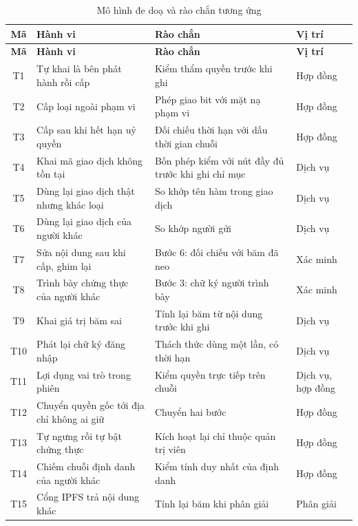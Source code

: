 \begin{longtable}{|c|p{4.6cm}|p{6.0cm}|p{2.0cm}|}
\caption{Mô hình đe doạ và rào chắn tương ứng}
\label{tab:v2-threat} \\
\hline
\textbf{Mã} & \textbf{Hành vi} & \textbf{Rào chắn} & \textbf{Vị trí} \\ \hline
\endfirsthead
\hline
\textbf{Mã} & \textbf{Hành vi} & \textbf{Rào chắn} & \textbf{Vị trí} \\ \hline
\endhead
T1 & Tự khai là bên phát hành rồi cấp & Kiểm thẩm quyền trước khi ghi & Hợp đồng \\ \hline
T2 & Cấp loại ngoài phạm vi & Phép giao bit với mặt nạ phạm vi & Hợp đồng \\ \hline
T3 & Cấp sau khi hết hạn uỷ quyền & Đối chiếu thời hạn với dấu thời gian chuỗi & Hợp đồng \\ \hline
T4 & Khai mã giao dịch không tồn tại & Bốn phép kiểm với nút đầy đủ trước khi ghi chỉ mục & Dịch vụ \\ \hline
T5 & Dùng lại giao dịch thật nhưng khác loại & So khớp tên hàm trong giao dịch & Dịch vụ \\ \hline
T6 & Dùng lại giao dịch của người khác & So khớp người gửi & Dịch vụ \\ \hline
T7 & Sửa nội dung sau khi cấp, ghim lại & Bước 6: đối chiếu với băm đã neo & Xác minh \\ \hline
T8 & Trình bày chứng thực của người khác & Bước 3: chữ ký người trình bày & Xác minh \\ \hline
T9 & Khai giá trị băm sai & Tính lại băm từ nội dung trước khi ghi & Dịch vụ \\ \hline
T10 & Phát lại chữ ký đăng nhập & Thách thức dùng một lần, có thời hạn & Dịch vụ \\ \hline
T11 & Lợi dụng vai trò trong phiên & Kiểm quyền trực tiếp trên chuỗi & Dịch vụ, hợp đồng \\ \hline
T12 & Chuyển quyền gốc tới địa chỉ không ai giữ & Chuyển hai bước & Hợp đồng \\ \hline
T13 & Tự ngưng rồi tự bật chứng thực & Kích hoạt lại chỉ thuộc quản trị viên & Hợp đồng \\ \hline
T14 & Chiếm chuỗi định danh của người khác & Kiểm tính duy nhất của định danh & Hợp đồng \\ \hline
T15 & Cổng IPFS trả nội dung khác & Tính lại băm khi phân giải & Phân giải \\ \hline
\end{longtable}
